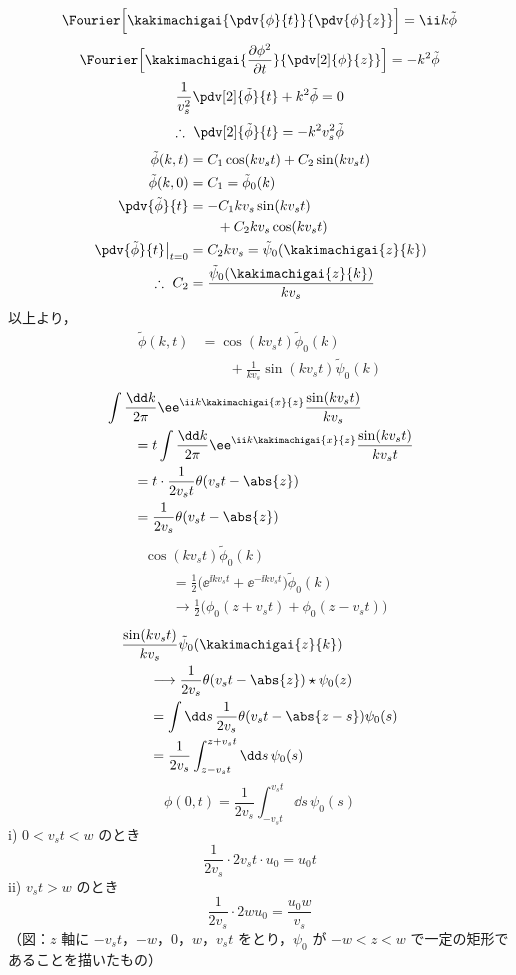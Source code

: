 \[ \Fourier\Bigl[\kakimachigai{\pdv{\phi}{t}}{\pdv{\phi}{z}}\Bigr]=\ii k\tilde{\phi} \]
\[ \Fourier\Bigl[\kakimachigai{\frac{\partial\phi^{2}}{\partial t}}{\pdv[2]{\phi}{z}}\Bigr]=-k^{2}\tilde{\phi} \]
\[ \frac{1}{v_s^{2}}\pdv[2]{\tilde{\phi}}{t}+k^{2}\tilde{\phi}=0 \]
\[ \therefore\ \pdv[2]{\tilde{\phi}}{t}=-k^{2}v_s^{2}\tilde{\phi} \]
\begin{align*}
  \tilde{\phi}(k,t)&=C_1\cos(kv_st)+C_2\sin(kv_st)\\
  \tilde{\phi}(k,0)&=C_1=\tilde{\phi}_0(k)\\
  \pdv{\tilde{\phi}}{t}&=-C_1kv_s\sin(kv_st)\\
  &\qquad+C_2kv_s\cos(kv_st)\\
  \left.\pdv{\tilde{\phi}}{t}\right|_{t=0}&=C_2kv_s=\tilde{\psi}_0(\kakimachigai{z}{k})\\
  \therefore\ C_2&=\frac{\tilde{\psi}_0(\kakimachigai{z}{k})}{kv_s}
\end{align*}
以上より，
\begin{align*}
  \tilde{\phi}(k,t)&=\cos(kv_st)\tilde{\phi}_0(k)\\
  &\qquad+\frac{1}{kv_s}\sin(kv_st)\tilde{\psi}_0(k)
\end{align*}
\begin{align*}
  &\int\frac{\dd k}{2\pi}\ee^{\ii k\kakimachigai{x}{z}}\frac{\sin(kv_st)}{kv_s}\\
  &\qquad=t\int\frac{\dd k}{2\pi}\ee^{\ii k\kakimachigai{x}{z}}\frac{\sin(kv_st)}{kv_st}\\
  &\qquad=t\cdot\frac{1}{2v_st}\theta(v_st-\abs{z})\\
  &\qquad=\frac{1}{2v_s}\theta(v_st-\abs{z})
\end{align*}
\begin{align*}
  &\cos(kv_st)\tilde{\phi}_0(k)\\
  &\qquad=\frac{1}{2}\bigl(\ee^{\ii kv_st}+\ee^{-\ii kv_st}\bigr)\tilde{\phi}_0(k)\\
  &\qquad\longrightarrow\frac{1}{2}\bigl(\phi_0(z+v_st)+\phi_0(z-v_st)\bigr)
\end{align*}
\begin{align*}
  &\frac{\sin(kv_st)}{kv_s}\tilde{\psi}_0(\kakimachigai{z}{k})\\
  &\qquad\longrightarrow\frac{1}{2v_s}\theta(v_st-\abs{z})\star\psi_0(z)\\
  &\qquad=\int\dd s\,\frac{1}{2v_s}\theta(v_st-\abs{z-s})\psi_0(s)\\
  &\qquad=\frac{1}{2v_s}\int_{z-v_st}^{z+v_st}\dd s\,\psi_0(s)
\end{align*}
\[ \phi(0,t)=\frac{1}{2v_s}\int_{-v_st}^{v_st}\dd s\,\psi_0(s) \]
i) $0<v_st<w$ のとき
\[ \frac{1}{2v_s}\cdot2v_st\cdot u_0=u_0t \]
ii) $v_st>w$ のとき
\[ \frac{1}{2v_s}\cdot2wu_0=\frac{u_0w}{v_s} \]
（図：$z$ 軸に $-v_st$，$-w$，$0$，$w$，$v_st$ をとり，$\psi_0$ が $-w<z<w$ で一定の矩形であることを描いたもの）

